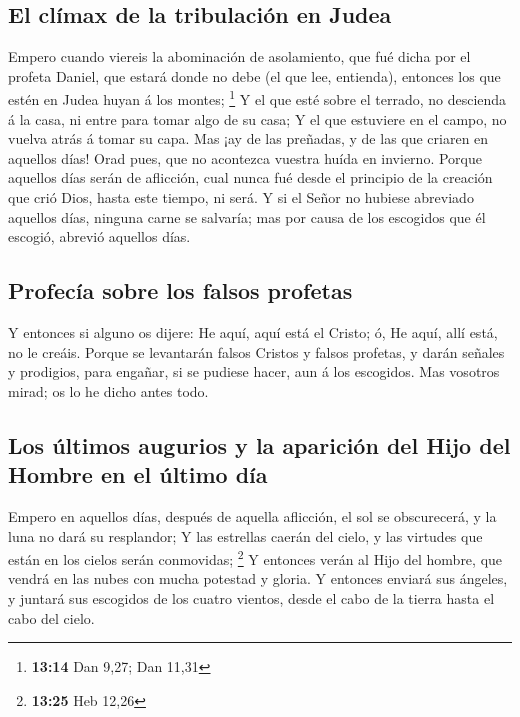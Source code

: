 \hypertarget{el-cluxedmax-de-la-tribulaciuxf3n-en-judea}{%
\subsection{El clímax de la tribulación en
Judea}\label{el-cluxedmax-de-la-tribulaciuxf3n-en-judea}}

 Empero cuando viereis la abominación de asolamiento, que
fué dicha por el profeta Daniel, que estará donde no debe (el que lee,
entienda), entonces los que estén en Judea huyan á los montes;
\footnote{\textbf{13:14} Dan 9,27; Dan 11,31}  Y el que
esté sobre el terrado, no descienda á la casa, ni entre para tomar algo
de su casa;  Y el que estuviere en el campo, no vuelva
atrás á tomar su capa.  Mas ¡ay de las preñadas, y de las
que criaren en aquellos días!  Orad pues, que no
acontezca vuestra huída en invierno.  Porque aquellos
días serán de aflicción, cual nunca fué desde el principio de la
creación que crió Dios, hasta este tiempo, ni será.  Y si
el Señor no hubiese abreviado aquellos días, ninguna carne se salvaría;
mas por causa de los escogidos que él escogió, abrevió aquellos días.

\hypertarget{profecuxeda-sobre-los-falsos-profetas}{%
\subsection{Profecía sobre los falsos
profetas}\label{profecuxeda-sobre-los-falsos-profetas}}

 Y entonces si alguno os dijere: He aquí, aquí está el
Cristo; ó, He aquí, allí está, no le creáis.  Porque se
levantarán falsos Cristos y falsos profetas, y darán señales y
prodigios, para engañar, si se pudiese hacer, aun á los escogidos.
 Mas vosotros mirad; os lo he dicho antes todo.

\hypertarget{los-uxfaltimos-augurios-y-la-apariciuxf3n-del-hijo-del-hombre-en-el-uxfaltimo-duxeda}{%
\subsection{Los últimos augurios y la aparición del Hijo del Hombre en
el último
día}\label{los-uxfaltimos-augurios-y-la-apariciuxf3n-del-hijo-del-hombre-en-el-uxfaltimo-duxeda}}

 Empero en aquellos días, después de aquella aflicción,
el sol se obscurecerá, y la luna no dará su resplandor; 
Y las estrellas caerán del cielo, y las virtudes que están en los cielos
serán conmovidas; \footnote{\textbf{13:25} Heb 12,26}  Y
entonces verán al Hijo del hombre, que vendrá en las nubes con mucha
potestad y gloria.  Y entonces enviará sus ángeles, y
juntará sus escogidos de los cuatro vientos, desde el cabo de la tierra
hasta el cabo del cielo.

